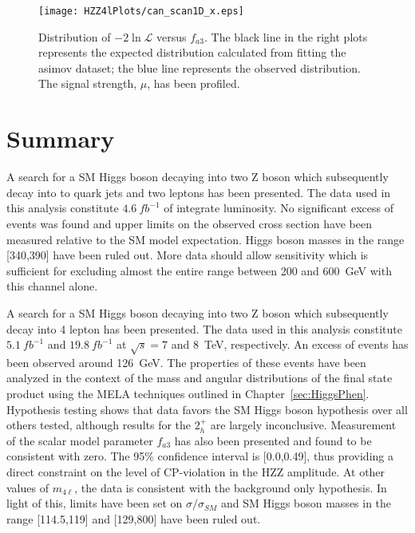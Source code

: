 \begin{figure}
\begin{center}
\texttt{[image: HZZ4lPlots/can\_scan1D\_x.eps]}
\caption{Distribution of $-2\ln\mathscr{L}$ versus $f_{a3}$.
The black line in the right plots 
represents the expected distribution calculated from fitting 
the asimov dataset; the blue line represents the observed 
distribution. The signal strength, $\mu$, has been profiled.}
\label{fig:HZZ4lfa3Fits1D}
\end{center}
\end{figure}


\section{Summary}


A search for a SM Higgs boson decaying into two Z boson which
subsequently decay into to quark jets and two leptons has been 
presented. The data used in this analysis constitute $4.6~fb^{-1}$ 
of integrate luminosity.  No significant excess of events was 
found and upper limits on the observed cross section have been
measured relative to the SM model expectation.  Higgs boson masses
in the range [340,390] have been ruled out. 
More data should allow sensitivity 
which is sufficient for excluding almost the entire range between 
200 and 600~GeV with this channel alone.  

A search for a SM Higgs boson decaying into two Z boson which
subsequently decay into 4 lepton has been presented.  The data
used in this analysis constitute $5.1~fb^{-1}$ and $19.8~fb^{-1}$ 
at $\sqrt{s}=7$ and 8~TeV, respectively.  An excess of events
has been observed around 126~GeV.  The properties of these 
events have been analyzed in the context of the mass and angular
distributions of the final state product using the MELA techniques
outlined in Chapter~\ref{sec:HiggsPhen}.  Hypothesis testing 
shows that data favors the SM Higgs boson hypothesis over all 
others tested, although results for the $2_h^+$ are largely
inconclusive.  Measurement of the scalar model parameter $f_{a3}$
has also been presented and found to be consistent with zero.  
The 95\% confidence interval is [0.0,0.49], thus providing a 
direct constraint on the level of CP-violation in the HZZ
amplitude. At other values of $m_{4\ell}$, the data is consistent
with the background only hypothesis.  In light of this, limits
have been set on $\sigma/\sigma_{SM}$ and SM Higgs boson masses 
in the range [114.5,119] and [129,800] have been ruled out.  

